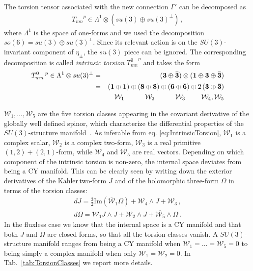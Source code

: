 \documentclass[12pt,a4paper]{book}
\def\nn{\nonumber}
\newcommand{\Kahler}{\ensuremath{\text{K}\ddot{\text{a}}\text{hler}\,}}
\def\nn{\nonumber}
\begin{document}
The torsion tensor associated with the new connection $\Gamma'$ can be decomposed as	
\begin{align}
\label{eq:TorsionDecomposition}
{T_{mn}}^p \in \Lambda^1 \otimes \left(su(3) \oplus su(3)^{\perp}\right) \,,
\end{align}
where $\Lambda^1$ is the space of one-forms and we used the decomposition $so(6) = su(3) \oplus su(3)^{\perp}$. Since its relevant action is on the $SU(3)$-invariant component of $\eta_\pm$, the $su(3)$ piece can be ignored. The corresponding decomposition is called \textit{intrinsic torsion} ${T^0_{mn}}^p$ and takes the form
\begin{eqnarray}
\label{eq:IntrinsicTorsion}
T^0_{mn}\,^p \in \Lambda^1 \otimes su(3)^\perp &=& ({\bf 3} \oplus {\bf \bar
3}) \otimes  ({\bf 1} \oplus {\bf 3} \oplus {\bf \bar 3}) \nn \\
&=& ({\bf 1} \oplus {\bf 
1}) \oplus  ({\bf 8} \oplus {\bf 8}) \oplus ({\bf 6} \oplus {\bf \bar
6}) \oplus  2 \, ({\bf 3} \oplus {\bf \bar 3} ) \\
&& \quad \mathcal{W}_1 \quad  \quad\quad   \mathcal{W}_2 \quad  \quad\quad \mathcal{W}_3 \quad
\quad \,\, \mathcal{W}_4, \mathcal{W}_5 \nn
\end{eqnarray}

$\mathcal{W}_1, \dots, \mathcal{W}_5$ are the five torsion classes appearing in the covariant derivative of the globally well defined spinor, which characterize the differential properties of the $SU(3)$-structure manifold~\cite{Dall'Agata:2004dk, LopesCardoso:2002vpf, Gauntlett:2003cy, Grana:2004sv, Dall'Agata:2003ir}. As inferable from eq. \eqref{eq:IntrinsicTorsion}, $\mathcal{W}_1$ is a complex scalar, $\mathcal{W}_2$ is a complex two-form, $\mathcal{W}_3$ is a real primitive $(1,2) + (2,1)$-form, while $\mathcal{W}_4$ and $\mathcal{W}_5$ are real vectors. Depending on which component of the intrinsic torsion is non-zero, the internal space deviates from being a CY manifold. This can be clearly seen by writing down the exterior derivatives of the \Kahler two-form $J$ and of the holomorphic three-form $\Omega$ in terms of the torsion classes:
\begin{align}
\label{eq:dJdOmegaTorsion}
dJ = \frac{3}{2} \text{Im} \left(\overline{\mathcal{W}}_1 \Omega\right) + \mathcal{W}_4 \wedge J + \mathcal{W}_3 \,, \\
d\Omega = \mathcal{W}_1 J \wedge J + \mathcal{W}_2 \wedge J + \overline{\mathcal{W}_5} \wedge \Omega \,.
\end{align}
In the fluxless case we know that the internal space is a CY manifold and that both $J$ and $\Omega$ are closed forms, so that all the torsion classes vanish. A $SU(3)$-structure manifold ranges from being a CY manifold when $\mathcal{W}_1 = \dots = \mathcal{W}_5 = 0$ to being simply a complex manifold when only $\mathcal{W}_1 = \mathcal{W}_2 = 0$. In Tab.~\ref{tab:TorsionClasses} we report more details.
\end{document}
